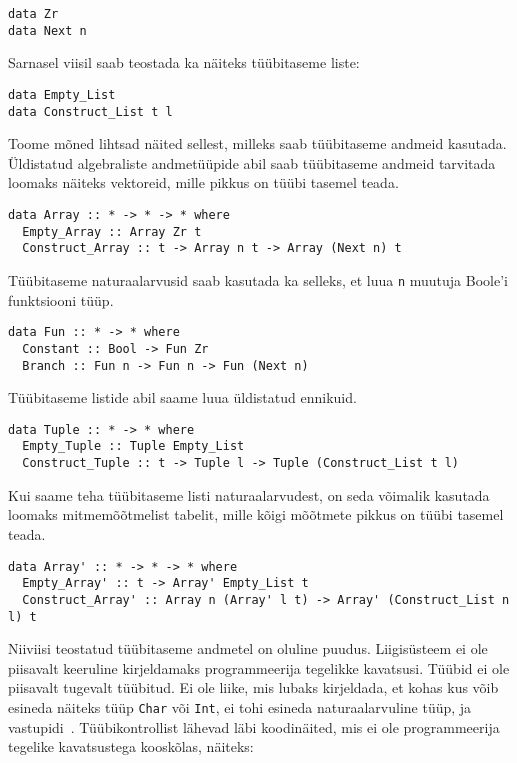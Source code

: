 \documentclass[12pt]{article}
\begin{document}
      \begin{verbatim}data Zr
data Next n\end{verbatim}

      Sarnasel viisil saab teostada ka näiteks tüübitaseme liste:

      \begin{verbatim}data Empty_List
data Construct_List t l\end{verbatim}

      Toome mõned lihtsad näited sellest, milleks saab tüübitaseme andmeid kasutada. Üldistatud algebraliste andmetüüpide abil saab tüübitaseme andmeid tarvitada loomaks näiteks vektoreid, mille pikkus on tüübi tasemel teada.

      \begin{verbatim}data Array :: * -> * -> * where
  Empty_Array :: Array Zr t
  Construct_Array :: t -> Array n t -> Array (Next n) t\end{verbatim}

      Tüübitaseme naturaalarvusid saab kasutada ka selleks, et luua \verb!n! muutuja Boole'i funktsiooni tüüp.

      \begin{verbatim}data Fun :: * -> * where
  Constant :: Bool -> Fun Zr
  Branch :: Fun n -> Fun n -> Fun (Next n)\end{verbatim}

      Tüübitaseme listide abil saame luua üldistatud ennikuid.

      \begin{verbatim}data Tuple :: * -> * where
  Empty_Tuple :: Tuple Empty_List
  Construct_Tuple :: t -> Tuple l -> Tuple (Construct_List t l)\end{verbatim}

      Kui saame teha tüübitaseme listi naturaalarvudest, on seda võimalik kasutada loomaks mitmemõõtmelist tabelit, mille kõigi mõõtmete pikkus on tüübi tasemel teada.

      \begin{verbatim}data Array' :: * -> * -> * where
  Empty_Array' :: t -> Array' Empty_List t
  Construct_Array' :: Array n (Array' l t) -> Array' (Construct_List n l) t\end{verbatim}

      Niiviisi teostatud tüübitaseme andmetel on oluline puudus. Liigisüsteem ei ole piisavalt keeruline kirjeldamaks programmeerija tegelikke kavatsusi. Tüübid ei ole piisavalt tugevalt tüübitud. Ei ole liike, mis lubaks kirjeldada, et kohas kus võib esineda näiteks tüüp \verb!Char! või \verb!Int!, ei tohi esineda naturaalarvuline tüüp, ja vastupidi~\cite{Giv}. Tüübikontrollist lähevad läbi koodinäited, mis ei ole programmeerija tegelike kavatsustega kooskõlas, näiteks:
\end{document}
